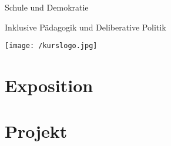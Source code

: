 \documentclass{dsa-latex/newlayout}
\begin{document}
 \setcounter{page}{3}

\setcounter{tocdepth}{1}
 \tableofcontents

   \setcounter{secnumdepth}{1}

\setcounter{page}{7}
\setcounter{chapter}{0}


\begin{coursetitle}
  \centerline{Schule und Demokratie}
  \bigskip
  \Large \centerline{Inklusive Pädagogik und Deliberative Politik}
  \bigskip
 \texttt{[image: /kurslogo.jpg]}
 \label{fig:meinbild}
  \bigskip
\end{coursetitle}


\section{Exposition}
	
	
	
	
	
	
	
	
\section{Projekt}
	
	
	
	
\end{document}
